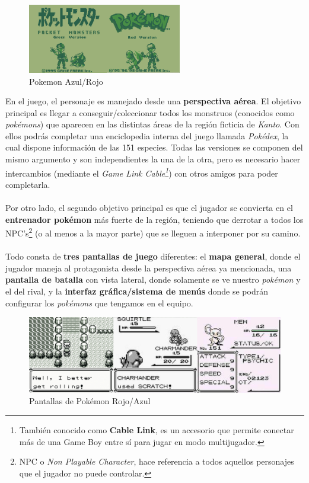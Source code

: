\begin{figure}[h]
\centering
\includegraphics[width=0.6\textwidth]{include/images/GameBoy/pokemon.png}
\caption{Pokemon Azul/Rojo}
\label{figure:poke_rb}
\end{figure}

En el juego, el personaje es manejado desde una \textbf{perspectiva aérea}. El objetivo principal es llegar a conseguir/coleccionar todos los monstruos (conocidos como \textit{pokémons}) que aparecen en las distintas áreas de la región ficticia de \textit{Kanto}. Con ellos podrás completar una enciclopedia interna del juego llamada \textit{Pokédex}, la cual dispone información de las 151 especies. Todas las versiones se componen del mismo argumento y son independientes la una de la otra, pero es necesario hacer intercambios (mediante el \textit{Game Link Cable\footnote{También conocido como \textbf{Cable Link}, es un accesorio que permite conectar más de una Game Boy entre sí para jugar en modo multijugador.}}) con otros amigos para poder completarla.
\\ \\
Por otro lado, el segundo objetivo principal es que el jugador se convierta en el \textbf{entrenador pokémon} más fuerte de la región, teniendo que derrotar a todos los NPC's\footnote{NPC o \textit{Non Playable Character}, hace referencia a todos aquellos personajes que el jugador no puede controlar.} (o al menos a la mayor parte) que se lleguen a interponer por su camino.
\\ \\
Todo consta de \textbf{tres pantallas de juego} diferentes: el \textbf{mapa general}, donde el jugador maneja al protagonista desde la perspectiva aérea ya mencionada, una \textbf{pantalla de batalla} con vista lateral, donde solamente se ve nuestro \textit{pokémon} y el del rival, y la \textbf{interfaz gráfica/sistema de menús} donde se podrán configurar los \textit{pokémons} que tengamos en el equipo.

\begin{figure}[h]
\centering
\includegraphics[width=1\textwidth]{include/images/GameBoy/pokemon_screens.png}
\caption{Pantallas de Pokémon Rojo/Azul}
\label{figure:poke_rb_screens}
\end{figure}

